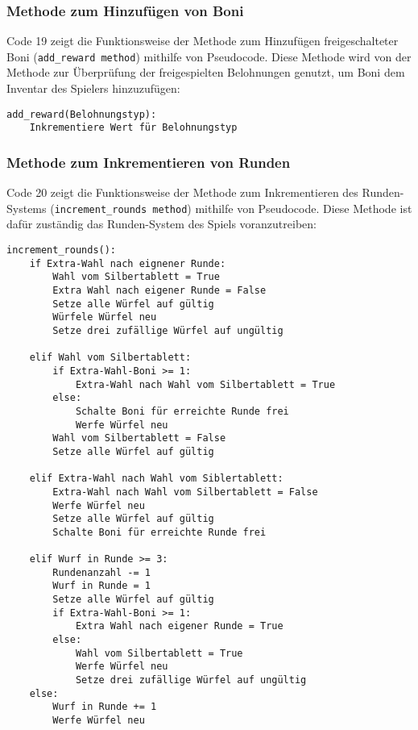 \subsubsection{Methode zum Hinzufügen von Boni}
\begin{minipage}{\linewidth}
Code 19 zeigt die Funktionsweise der Methode zum Hinzufügen freigeschalteter Boni (\texttt{add\_reward method}) mithilfe von Pseudocode. Diese Methode wird von der Methode zur Überprüfung der freigespielten Belohnungen genutzt, um Boni dem Inventar des Spielers hinzuzufügen:
\vspace{0.5cm}
\begin{lstlisting}[caption={Methode zum Hinzufügen freigschalteter Boni}]
add_reward(Belohnungstyp):
	Inkrementiere Wert für Belohnungstyp
\end{lstlisting}
\end{minipage}

\subsubsection{Methode zum Inkrementieren von Runden}
Code 20 zeigt die Funktionsweise der Methode zum Inkrementieren des Runden-Systems (\texttt{increment\_rounds method}) mithilfe von Pseudocode. Diese Methode ist dafür zuständig das Runden-System des Spiels voranzutreiben:
\vspace{0.5cm}
\begin{lstlisting}[caption={Methode zum Inkrementieren des Runden-Systems}]
increment_rounds():
	if Extra-Wahl nach eignener Runde:
		Wahl vom Silbertablett = True
		Extra Wahl nach eigener Runde = False
		Setze alle Würfel auf gültig
		Würfele Würfel neu
		Setze drei zufällige Würfel auf ungültig
		
	elif Wahl vom Silbertablett:
		if Extra-Wahl-Boni >= 1:
			Extra-Wahl nach Wahl vom Silbertablett = True
		else:
			Schalte Boni für erreichte Runde frei
			Werfe Würfel neu
		Wahl vom Silbertablett = False
		Setze alle Würfel auf gültig
	
	elif Extra-Wahl nach Wahl vom Siblertablett:
		Extra-Wahl nach Wahl vom Silbertablett = False
		Werfe Würfel neu
		Setze alle Würfel auf gültig
		Schalte Boni für erreichte Runde frei
	
	elif Wurf in Runde >= 3:
		Rundenanzahl -= 1
		Wurf in Runde = 1
		Setze alle Würfel auf gültig
		if Extra-Wahl-Boni >= 1:
			Extra Wahl nach eigener Runde = True
		else:
			Wahl vom Silbertablett = True
			Werfe Würfel neu
			Setze drei zufällige Würfel auf ungültig
	else:
		Wurf in Runde += 1
		Werfe Würfel neu
\end{lstlisting}
